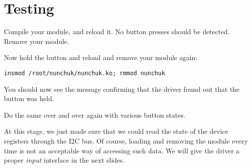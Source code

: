 \section{Testing}

Compile your module, and reload it. No button presses should be
detected. Remove your module.

Now hold the  button and reload and remove your module again:
\begin{verbatim}
insmod /root/nunchuk/nunchuk.ko; rmmod nunchuk
\end{verbatim}

You should now see the message confirming that the driver found
out that the  button was held.

Do the same over and over again with various button states.

At this stage, we just made sure that we could read the state
of the device registers through the I2C bus. Of course, loading and
removing the module every time is not an acceptable way of
accessing such data. We will give the driver a proper {\em input}
interface in the next slides.
